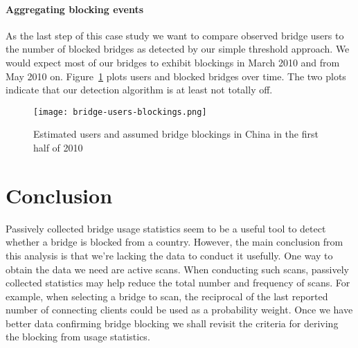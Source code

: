 \documentclass{article}
\begin{document}
\paragraph{Aggregating blocking events}

As the last step of this case study we want to compare observed bridge
users to the number of blocked bridges as detected by our simple threshold
approach.
We would expect most of our bridges to exhibit blockings in March 2010 and
from May 2010 on.
Figure~\ref{fig:bridge-users-blockings} plots users and blocked bridges
over time.
The two plots indicate that our detection algorithm is at least not
totally off.

\begin{figure}[t]
\texttt{[image: bridge-users-blockings.png]}
\caption{Estimated users and assumed bridge blockings in China in the
first half of 2010}
\label{fig:bridge-users-blockings}
\end{figure}

\section{Conclusion}

Passively collected bridge usage statistics seem to be a useful tool to
detect whether a bridge is blocked from a country.
However, the main conclusion from this analysis is that we're lacking the
data to conduct it usefully.
One way to obtain the data we need are active scans.
When conducting such scans, passively collected statistics may help reduce
the total number and frequency of scans.
For example, when selecting a bridge to scan, the reciprocal of the last
reported number of connecting clients could be used as a probability
weight.
Once we have better data confirming bridge blocking we shall revisit the
criteria for deriving the blocking from usage statistics.
\end{document}
